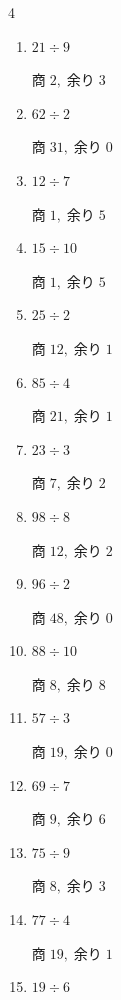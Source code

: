 \begin{multicols}{4}
\begin{enumerate}
        $商\; 16,\; 余り\; 0$

  \item $21 \div 9$

        $商\; 2,\; 余り\; 3$

  \item $62 \div 2$

        $商\; 31,\; 余り\; 0$

  \item $12 \div 7$

        $商\; 1,\; 余り\; 5$

  \item $15 \div 10$

        $商\; 1,\; 余り\; 5$

  \item $25 \div 2$

        $商\; 12,\; 余り\; 1$

  \item $85 \div 4$

        $商\; 21,\; 余り\; 1$

  \item $23 \div 3$

        $商\; 7,\; 余り\; 2$

  \item $98 \div 8$

        $商\; 12,\; 余り\; 2$

  \item $96 \div 2$

        $商\; 48,\; 余り\; 0$

\columnbreak %

  \item $88 \div 10$

        $商\; 8,\; 余り\; 8$

  \item $57 \div 3$

        $商\; 19,\; 余り\; 0$

  \item $69 \div 7$

        $商\; 9,\; 余り\; 6$

  \item $75 \div 9$

        $商\; 8,\; 余り\; 3$

  \item $77 \div 4$

        $商\; 19,\; 余り\; 1$

  \item $19 \div 6$


\end{enumerate}
\end{multicols}
